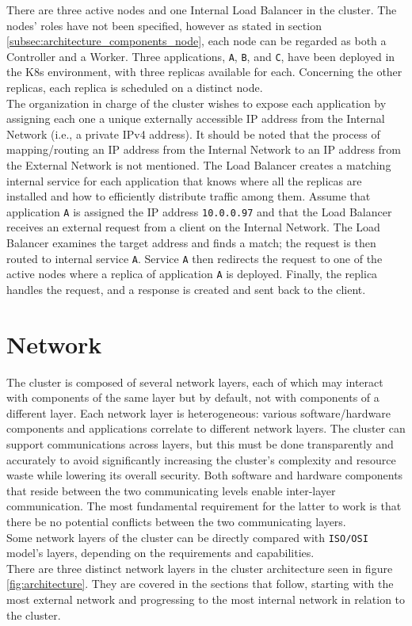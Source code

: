 There are three active nodes and one Internal Load Balancer in the cluster. The nodes'
roles have not been specified, however as stated in section \ref{subsec:architecture_components_node},
each node can be regarded as both a Controller and a Worker. Three applications,
\texttt{A}, \texttt{B}, and \texttt{C}, have been deployed in the K8s
environment, with three replicas available for each. Concerning the other
replicas, each replica is scheduled on a distinct node. \\ %
The organization in charge of the cluster wishes to expose each application by assigning
each one a unique externally accessible IP address from the Internal Network (i.e.,
a private IPv4 address). It should be noted that the process of mapping/routing
an IP address from the Internal Network to an IP address from the External
Network is not mentioned. The Load Balancer creates a matching internal service for
each application that knows where all the replicas are installed and how to efficiently
distribute traffic among them. Assume that application \texttt{A} is assigned the
IP address \texttt{10.0.0.97} and that the Load Balancer receives an external
request from a client on the Internal Network. The Load Balancer examines the target
address and finds a match; the request is then routed to internal service
\texttt{A}. Service \texttt{A} then redirects the request to one of the active nodes
where a replica of application \texttt{A} is deployed. Finally, the replica
handles the request, and a response is created and sent back to the client.

\section{Network}
\label{sec:architecture_network}

The cluster is composed of several network layers, each of which may interact with
components of the same layer but by default, not with components of a different
layer. Each network layer is heterogeneous: various software/hardware components
and applications correlate to different network layers. The cluster can support communications
across layers, but this must be done transparently and accurately to avoid
significantly increasing the cluster's complexity and resource waste while
lowering its overall security. Both software and hardware components that reside
between the two communicating levels enable inter-layer communication. The most
fundamental requirement for the latter to work is that there be no potential
conflicts between the two communicating layers. \\ %
Some network layers of the cluster can be directly compared with \texttt{ISO/OSI}
model's layers, depending on the requirements and capabilities. \\ %
There are three distinct network layers in the cluster architecture seen in
figure \ref{fig:architecture}. They are covered in the sections that follow,
starting with the most external network and progressing to the most internal
network in relation to the cluster.

